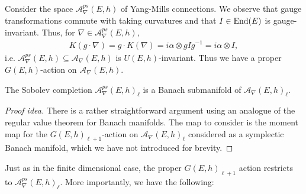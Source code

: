 \documentclass[12pt]{ociamthesis}  %
\begin{document}
Consider the space $\mathcal A_\nabla^{ps}(E,h)$ of Yang-Mills connections.
We observe that gauge transformations commute with taking curvatures and
that $I\in\operatorname{End}(E)$ is gauge-invariant. Thus, for $\nabla\in \mathcal A_\nabla^{ps}(E,h)$,
\begin{align*}
  K(g\cdot\nabla)
  = g\cdot K(\nabla)
  = i\alpha\otimes gIg^{-1}
  = i\alpha\otimes I,
\end{align*}
i.e. $\mathcal A_\nabla^{ps}(E,h)\subseteq \mathcal A_\nabla(E,h)$ is $U(E,h)$-invariant.
Thus we have a proper $G(E,h)$-action on $\mathcal A_\nabla(E,h)$.

\begin{lemma}
  The Sobolev completion $\mathcal A^{ps}_\nabla(E,h)_\ell$ is a
  Banach submanifold of $\mathcal A_\nabla(E,h)_\ell$.
  \begin{proof}[Proof idea]
    There is a rather straightforward argument using an analogue
    of the regular value theorem for Banach manifolds. The map
    to consider is the moment map for the $G(E,h)_{\ell+1}$-action
    on $\mathcal A_\nabla(E,h)_\ell$ considered as a symplectic
    Banach manifold, which we have not introduced for brevity.
    \missingcitation
  \end{proof}
\end{lemma}
Just as in the finite dimensional case, the proper $G(E,h)_{\ell+1}$
action restricts to $\mathcal A^{ps}_\nabla(E,h)_\ell$.
More importantly, we have the following:
\end{document}
